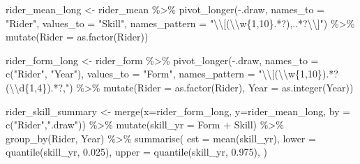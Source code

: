 \documentclass[
]{article}
\newenvironment{Shaded}{\begin{snugshade}}{\end{snugshade}}
\newcommand{\AttributeTok}[1]{\textcolor[rgb]{0.77,0.63,0.00}{#1}}
\newcommand{\FloatTok}[1]{\textcolor[rgb]{0.00,0.00,0.81}{#1}}
\newcommand{\FunctionTok}[1]{\textcolor[rgb]{0.00,0.00,0.00}{#1}}
\newcommand{\NormalTok}[1]{#1}
\newcommand{\OtherTok}[1]{\textcolor[rgb]{0.56,0.35,0.01}{#1}}
\newcommand{\SpecialCharTok}[1]{\textcolor[rgb]{0.00,0.00,0.00}{#1}}
\newcommand{\StringTok}[1]{\textcolor[rgb]{0.31,0.60,0.02}{#1}}
\begin{document}
\begin{Shaded}
\begin{Highlighting}[]
\NormalTok{rider\_mean\_long }\OtherTok{\textless{}{-}}
\NormalTok{  rider\_mean  }\SpecialCharTok{\%\textgreater{}\%}
  \FunctionTok{pivot\_longer}\NormalTok{(}\SpecialCharTok{{-}}\NormalTok{.draw, }\AttributeTok{names\_to =} \StringTok{"Rider"}\NormalTok{, }\AttributeTok{values\_to =} \StringTok{"Skill"}\NormalTok{,}
               \AttributeTok{names\_pattern =} \StringTok{"}\SpecialCharTok{\textbackslash{}\textbackslash{}}\StringTok{[(}\SpecialCharTok{\textbackslash{}\textbackslash{}}\StringTok{w\{1,10\}.*?),..*?}\SpecialCharTok{\textbackslash{}\textbackslash{}}\StringTok{]"}\NormalTok{) }\SpecialCharTok{\%\textgreater{}\%} 
  \FunctionTok{mutate}\NormalTok{(}\AttributeTok{Rider =} \FunctionTok{as.factor}\NormalTok{(Rider))}

\NormalTok{rider\_form\_long }\OtherTok{\textless{}{-}}
\NormalTok{  rider\_form }\SpecialCharTok{\%\textgreater{}\%}
  \FunctionTok{pivot\_longer}\NormalTok{(}\SpecialCharTok{{-}}\NormalTok{.draw, }\AttributeTok{names\_to =} \FunctionTok{c}\NormalTok{(}\StringTok{"Rider"}\NormalTok{, }\StringTok{"Year"}\NormalTok{), }\AttributeTok{values\_to =} \StringTok{"Form"}\NormalTok{,}
               \AttributeTok{names\_pattern =} \StringTok{"}\SpecialCharTok{\textbackslash{}\textbackslash{}}\StringTok{[(}\SpecialCharTok{\textbackslash{}\textbackslash{}}\StringTok{w\{1,10\}).*?(}\SpecialCharTok{\textbackslash{}\textbackslash{}}\StringTok{d\{1,4\}).*?,"}\NormalTok{) }\SpecialCharTok{\%\textgreater{}\%}
  \FunctionTok{mutate}\NormalTok{(}\AttributeTok{Rider =} \FunctionTok{as.factor}\NormalTok{(Rider), }\AttributeTok{Year =} \FunctionTok{as.integer}\NormalTok{(Year))}

\NormalTok{rider\_skill\_summary }\OtherTok{\textless{}{-}}
  \FunctionTok{merge}\NormalTok{(}\AttributeTok{x=}\NormalTok{rider\_form\_long, }\AttributeTok{y=}\NormalTok{rider\_mean\_long, }\AttributeTok{by =} \FunctionTok{c}\NormalTok{(}\StringTok{"Rider"}\NormalTok{,}\StringTok{".draw"}\NormalTok{)) }\SpecialCharTok{\%\textgreater{}\%}
  \FunctionTok{mutate}\NormalTok{(}\AttributeTok{skill\_yr =}\NormalTok{ Form }\SpecialCharTok{+}\NormalTok{ Skill) }\SpecialCharTok{\%\textgreater{}\%}
  \FunctionTok{group\_by}\NormalTok{(Rider, Year) }\SpecialCharTok{\%\textgreater{}\%}
  \FunctionTok{summarise}\NormalTok{(}
    \AttributeTok{est =} \FunctionTok{mean}\NormalTok{(skill\_yr),}
    \AttributeTok{lower =} \FunctionTok{quantile}\NormalTok{(skill\_yr, }\FloatTok{0.025}\NormalTok{),}
    \AttributeTok{upper =} \FunctionTok{quantile}\NormalTok{(skill\_yr, }\FloatTok{0.975}\NormalTok{),}
\NormalTok{  )}
\end{Highlighting}
\end{Shaded}
\end{document}
